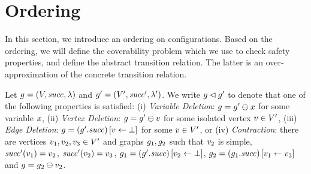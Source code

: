 %
\section{Ordering}
\label{section:orderings}
In this section, we introduce an ordering on configurations.
%
Based on the ordering, we will define the coverability problem
which we use to check safety properties, and
define the abstract transition relation.
%
The latter is an over-approximation of the concrete transition relation.

\smallskip{} 
Let $g=\left(V,{\it succ},\lambda\right)$ and
$g'=\left(V',{\it succ}',\lambda'\right)$.
%
We write $g\lhd g'$ to
denote that one of the following properties is satisfied:
(i)
  {\it Variable Deletion}: %
  $g=g'\ominus{\ensuremath{x}}$ for some variable $x$,
(ii)
  {\it Vertex Deletion}: %
  $g=g'\ominus{\ensuremath{v}}$ for some isolated vertex
  $v\in V'$,
(iii)
  {\it Edge Deletion}: %
  $g=\left(g'.{\it succ}\right)\left[v\leftarrow\bot\right]$ for some
  $v\in V'$, or
(iv)
  {\it Contraction}: %
  there are vertices $v_1,v_2,v_3\in V'$ and
  graphs $g_1,g_2$ such that $v_2$ is simple,
  ${\it succ}'(v_1)=v_2$, ${\it succ}'(v_2)=v_3$,
  $g_1=\left(g'.{\it succ}\right)\left[v_2\leftarrow\bot\right]$,
  $g_2=\left(g_1.{\it succ}\right)\left[v_1\leftarrow v_3\right]$
  and $g=g_2\ominus{\ensuremath{v}_2}$.

